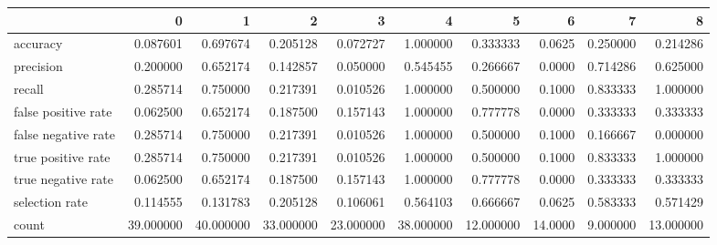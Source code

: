 \begin{tabular}{lrrrrrrrrr}
\toprule
{} &          0 &          1 &          2 &          3 &          4 &          5 &        6 &         7 &          8 \\
\midrule
accuracy            &   0.087601 &   0.697674 &   0.205128 &   0.072727 &   1.000000 &   0.333333 &   0.0625 &  0.250000 &   0.214286 \\
precision           &   0.200000 &   0.652174 &   0.142857 &   0.050000 &   0.545455 &   0.266667 &   0.0000 &  0.714286 &   0.625000 \\
recall              &   0.285714 &   0.750000 &   0.217391 &   0.010526 &   1.000000 &   0.500000 &   0.1000 &  0.833333 &   1.000000 \\
false positive rate &   0.062500 &   0.652174 &   0.187500 &   0.157143 &   1.000000 &   0.777778 &   0.0000 &  0.333333 &   0.333333 \\
false negative rate &   0.285714 &   0.750000 &   0.217391 &   0.010526 &   1.000000 &   0.500000 &   0.1000 &  0.166667 &   0.000000 \\
true positive rate  &   0.285714 &   0.750000 &   0.217391 &   0.010526 &   1.000000 &   0.500000 &   0.1000 &  0.833333 &   1.000000 \\
true negative rate  &   0.062500 &   0.652174 &   0.187500 &   0.157143 &   1.000000 &   0.777778 &   0.0000 &  0.333333 &   0.333333 \\
selection rate      &   0.114555 &   0.131783 &   0.205128 &   0.106061 &   0.564103 &   0.666667 &   0.0625 &  0.583333 &   0.571429 \\
count               &  39.000000 &  40.000000 &  33.000000 &  23.000000 &  38.000000 &  12.000000 &  14.0000 &  9.000000 &  13.000000 \\
\bottomrule
\end{tabular}
